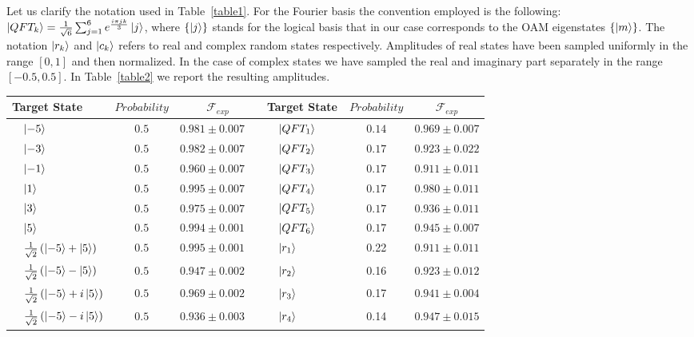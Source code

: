 Let us clarify the notation used in Table~\ref{table1}. For the Fourier basis the convention employed is the following: $\ket{QFT_k}=\frac{1}{\sqrt{6}}\sum_{j=1}^{6}e^{\frac{ i \pi jk }{3}}\ket{j}$, where $\{\ket{j}\}$ stands for the logical basis that in our case corresponds to the OAM eigenstates $\{\ket{m} \}$. The notation $\ket{r_k}$ and $\ket{c_k}$ refers to real and complex random states respectively. Amplitudes of real states have been sampled uniformly in the range $\left[0,1\right]$ and then normalized. In the case of complex states we have sampled the real and imaginary part separately in the range $\left[-0.5,0.5\right]$. In Table~\ref{table2} we report the resulting amplitudes.
\begin{table}[h!]
\centering\footnotesize
\begin{tabular}{lcc|lcc}
\toprule
Target State & $Probability$  & $\mathcal{F}_{exp}$  & Target State & $Probability$  & $\mathcal{F}_{exp}$ \\
\midrule
 $\quad\ket{-5}$ & $0.5$  & $0.981 \pm 0.007\quad$ &$\quad\ket{QFT_1}\qquad $ & $0.14$ & $0.969\pm 0.007$\\
 $\quad\ket{-3}$ & $0.5$ & $0.982 \pm 0.007\quad$ &$\quad\ket{QFT_2}$ & $0.17$ & $0.923\pm 0.022$ \\
 $\quad\ket{-1}$ & $0.5$ & $0.960 \pm 0.007\quad$ &$\quad\ket{QFT_3}$ & $0.17$ & $0.911\pm 0.011$\\ 
 $\quad\ket{1}$ & $0.5$ & $0.995 \pm 0.007\quad$ & $\quad\ket{QFT_4}$&$0.17$ &  $0.980\pm 0.011$ \\
 $\quad\ket{3}$ & $0.5$ & $0.975 \pm 0.007\quad$ & $\quad\ket{QFT_5 }$& $0.17$& $0.936\pm 0.011$ \\
 $\quad\ket{5}$ & $0.5$ & $0.994 \pm 0.001\quad$ & $\quad\ket{QFT_6} $& $0.17$ & $0.945\pm 0.007$ \\
 $\quad\frac{1}{\sqrt{2}}\left(\ket{-5}+\ket{5} \right)$ & $0.5$  & $0.995 \pm 0.001\quad$ &$\quad\ket{r_1}$ & 0.22& $0.911\pm0.011$\\
 $\quad\frac{1}{\sqrt{2}}\left(\ket{-5}-\ket{5}\right)$ & $0.5$ & $0.947 \pm 0.002\quad$ &$\quad\ket{r_2}$  & 0.16 & $0.923 \pm 0.012$\\
 $\quad\frac{1}{\sqrt{2}}\left(\ket{-5}+i\ket{5}\right)$ & $0.5$ & $0.969 \pm 0.002\quad$ &$\quad\ket{r_3}$  & 0.17 & $0.941 \pm 0.004$\\ 
  $\quad\frac{1}{\sqrt{2}}\left(\ket{-5}-i\ket{5}\right)$ & $0.5$ & $0.936 \pm 0.003\quad$&$\quad\ket{r_4} $& 0.14 &$0.947 \pm 0.015$  \\

\end{tabular}
\end{table}
